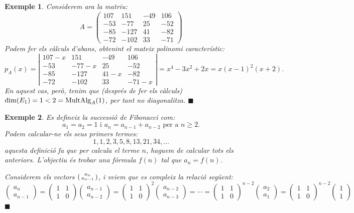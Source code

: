 \documentclass[
  11pt,
]{book}
\numberwithin{dummy}{section}
\theoremstyle{maincolornumbox}
\theoremstyle{blacknumex}
\newtheorem{exampleT}{Exemple}[chapter]
\theoremstyle{blacknumbox}
\theoremstyle{maincolornum}
\newenvironment{example}{\begin{exampleT}}{\hfill{\tiny\ensuremath{\blacksquare}}\end{exampleT}}
\newlength\esp
\begin{document}
\begin{example}
Considerem ara la matriu: \[A=\left(\begin{array}{rrrr}
107 & 151 & -49 & 106 \\
-53 & -77 & 25 & -52 \\
-85 & -127 & 41 & -82 \\
-72 & -102 & 33 & -71
\end{array}\right)\] Podem fer els càlculs d'abans, obtenint el mateix
polinomi característic: \[p_A(x)=\left|\begin{array}{cccc}
107-x & 151 & -49 & 106 \\
-53 & -77-x & 25 & -52 \\
-85 & -127 & 41-x & -82 \\
-72 & -102 & 33 & -71-x
\end{array}\right|=x^4-3x^2+2x=x(x-1)^2(x+2).\] En aquest cas, però,
tenim que (després de fer els càlculs) \(\dim(E_1)=1<2=\operatorname{MultAlg}_A(1)\),
per tant no diagonalitza.
\end{example}

\begin{example}
Es defineix la successió de Fibonacci com:
\[a_1=a_2=1 \text{ i } a_{n}=a_{n-1}+a_{n-2} \text{ per a $n\geq 2$}.\]
Podem calcular-ne els seus primers termes:
\[1, 1, 2, 3, 5, 8, 13, 21, 34, \dots\] aquesta definició fa que per
calcula el terme \(n\), haguem de calcular tots els anteriors. L'objectiu
és trobar una fórmula \(f(n)\) tal que \(a_n=f(n)\).

Considerem els vectors \(\left(\begin{smallmatrix}a_{n}\\a_{n-1}\end{smallmatrix}\right)\), i veiem que es compleix
la relació següent: \[\begin{pmatrix}
a_{n}\\a_{n-1}
\end{pmatrix}=
\begin{pmatrix}
1 & 1\\1 & 0
\end{pmatrix}
\begin{pmatrix}
a_{n-1}\\a_{n-2}
\end{pmatrix}=
\begin{pmatrix}
1 & 1\\1 & 0
\end{pmatrix}^2
\begin{pmatrix}
a_{n-2}\\a_{n-3}
\end{pmatrix}= \cdots =
\begin{pmatrix}
1 & 1\\1 & 0
\end{pmatrix}^{n-2}
\begin{pmatrix}
a_{2}\\a_{1}
\end{pmatrix}=
\begin{pmatrix}
1 & 1\\1 & 0
\end{pmatrix}^{n-2}
\begin{pmatrix}
1\\ 1
\end{pmatrix}\]
\end{example}
\end{document}
